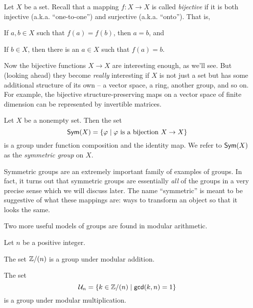 \begin{dfn}[Bijection]
Let \(X\) be a set.
Recall that a mapping \(f : X \rightarrow X\) is called \emph{bijective} if it is both injective (a.k.a. ``one-to-one'') and surjective (a.k.a. ``onto'').
That is,
\begin{proplist}
\item If \(a,b \in X\) such that \(f(a) = f(b)\), then \(a = b\), and
\item If \(b \in X\), then there is an \(a \in X\) such that \(f(a) = b\).
\end{proplist}
\end{dfn}

Now the bijective functions \(X \rightarrow X\) are interesting enough, as we'll see.
But (looking ahead) they become \emph{really} interesting if \(X\) is not just a set but has some additional structure of its own -- a vector space, a ring, another group, and so on.
For example, the bijective structure-preserving maps on a vector space of finite dimension can be represented by invertible matrices.

\begin{prop}
Let \(X\) be a nonempty set.
Then the set \[ \mathsf{Sym}(X) = \{ \varphi \mid \varphi\ \mathrm{is\ a\ bijection}\ X \rightarrow X \} \] is a group under function composition and the identity map.
We refer to \(\mathsf{Sym}(X)\) as the \emph{symmetric group} on \(X\).
\end{prop}

Symmetric groups are an extremely important family of examples of groups.
In fact, it turns out that symmetric groups are essentially \emph{all} of the groups in a very precise sense which we will discuss later.
The name ``symmetric'' is meant to be suggestive of what these mappings are: ways to transform an object so that it looks the same.

Two more useful models of groups are found in modular arithmetic.

\begin{prop}
Let \(n\) be a positive integer.
\begin{proplist}
\item The set \(\mathbb{Z}/(n)\) is a group under modular addition.
\item The set \[ \mathcal{U}_n = \{ k \in \mathbb{Z}/(n) \mid \mathsf{gcd}(k, n) = 1 \} \] is a group under modular multiplication.
\end{proplist}
\end{prop}
